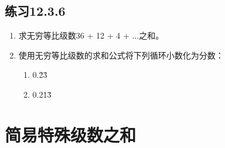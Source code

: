 \documentclass[9pt]{article}
\begin{document}
\begin{multicols}{2}
\begin{small}
        \subsection*{练习12.3.6}

        \begin{enumerate}
            \item 求无穷等比级数36 + 12 + 4 + $\ldots$之和。

            \item 使用无穷等比级数的求和公式将下列循环小数化为分数：
                  \begin{enumerate}
                      \item 0.\.{2}\.{3}

                      \item  0.2\.{1}\.{3}
                  \end{enumerate}

        \end{enumerate}

        \section{简易特殊级数之和}
    \end{small}
\end{multicols}
\end{document}
